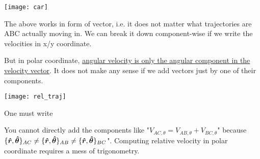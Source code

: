 \documentclass[class=article, crop=false, 12pt]{standalone}
\begin{document}
\begin{center}
    \begin{minipage}{0.3\linewidth}
        \centering
        \texttt{[image: car]}
    \end{minipage}
\end{center}

The above works in form of vector, 
i.e. it does not matter what trajectories are ABC actually moving in.
We can break it down component-wise if we write the velocities in x/y coordinate.

But in polar coordinate, \ul{angular velocity is only the angular component in the velocity vector}.
It does not make any sense if we add vectors just by one of their components.

\begin{center}
    \begin{minipage}{0.5\linewidth}
        \centering
        \texttt{[image: rel\_traj]}
    \end{minipage}
\end{center}


One must write 

You cannot directly add the components like 
"$V_{AC,\theta}=V_{AB,\theta}+V_{BC,\theta}$" because 
$\{\vu*{r},\vu*{\theta}\}_{AC} \neq \{\vu*{r},\vu*{\theta}\}_{AB} \neq \{\vu*{r},\vu*{\theta}\}_{BC}$".
Computing relative velocity in polar coordinate requires a mess of trigonometry.


\theend
\end{document}
